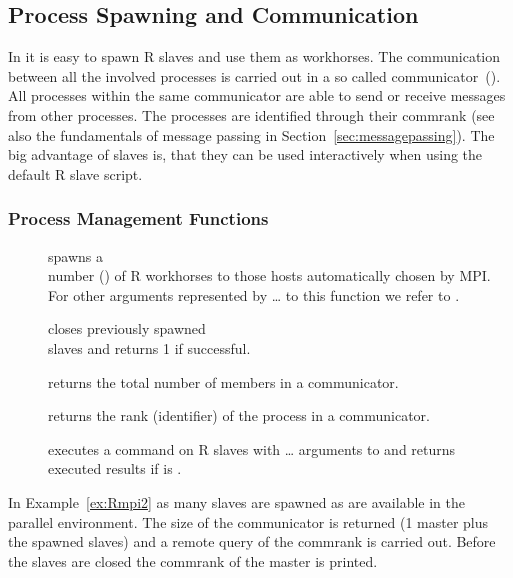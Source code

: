 \subsection{Process Spawning and Communication}

In  it is easy to spawn R slaves and use them as
workhorses. The 
communication between all the involved processes is carried out in a
so called communicator~(). All processes within the same
communicator are able to send or receive messages from other
processes. The processes are identified through their commrank (see
also the fundamentals of message passing in
Section~\ref{sec:messagepassing}). The big advantage of 
slaves is, that they can be used interactively when using the default
R slave script.

\subsubsection{Process Management Functions}
\begin{description}
\item[]
  spawns a \\number () of R
  workhorses to those hosts automatically chosen by MPI. For other
  arguments represented by \ldots{} to this function we refer to
  \cite{yu06Rmpi}.
\item[] closes
  previously spawned \\slaves and returns 1 if successful.
\item[] returns the total number of members in
  a communicator.
\item[] returns the rank (identifier) of the
  process in a communicator.
\item[]
  executes a command  on R slaves with \ldots{} arguments to
   and returns executed results if  is
  .
\end{description}

In Example~\ref{ex:Rmpi2} as many slaves are spawned as are available
in the parallel environment. The size of the communicator is returned
(1 master plus the spawned slaves) and a remote query of the commrank
is carried out. Before the slaves are closed the commrank of the
master is printed.

